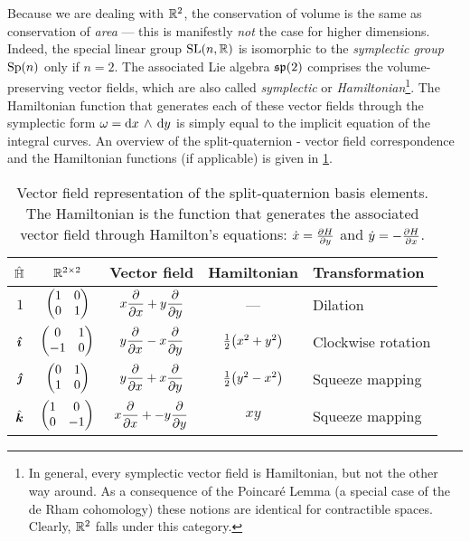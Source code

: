 Because we are dealing with $\real^2$, the conservation of volume is the same as conservation of \emph{area} --- this is manifestly \emph{not} the case for higher dimensions.  Indeed, the special linear group $\slgroup{n}{\real}$ is isomorphic to the \emph{symplectic group} $\spgroup{n}$ only if $n = 2$. The associated Lie algebra $\spalg{2}$ comprises the volume-preserving vector fields, which are also called \emph{symplectic} or \emph{Hamiltonian}\footnote{In general, every symplectic vector field is Hamiltonian, but not the other way around. As a consequence of the Poincaré Lemma (a special case of the de Rham cohomology) these notions are identical for contractible spaces. Clearly, $\real^2$ falls under this category.}. The Hamiltonian function that generates each of these vector fields through the symplectic form $\omega = \wedgep{\dd{x}}{\dd{y}}$ is simply equal to the implicit equation of the integral curves. An overview of the split-quaternion - vector field correspondence and the Hamiltonian functions (if applicable) is given in \cref{tab:basis_vf}.

\begin{table}[ht!]
    \centering
    \caption{Vector field representation of the split-quaternion basis elements. The Hamiltonian is the function that generates the associated vector field through Hamilton's equations: $\dot{x} = \pdv{H}{y}$ and $\dot{y} = -\pdv{H}{x}$.}
    \label{tab:basis_vf}
    \begin{tabular}{ccccl}
        \toprule
        $\spquaternions$ &  $ \real^{2\times 2} $ & \textbf{Vector field} & \textbf{Hamiltonian} & \textbf{Transformation} \\
        \midrule
        $1$ & $\mqty(1 & 0 \\ 0 & 1) $ & $\displaystyle x\pdv{}{x} + y\pdv{}{y} $ & --- & Dilation \\[0.4cm]
        $\quati$ & $\mqty(0 & 1 \\ -1 & 0) $ & $\displaystyle y\pdv{}{x} - x\pdv{}{y} $ & $ \tfrac{1}{2}\qty(x^2 + y^2) $ & Clockwise rotation \\[0.4cm]
        $\quatj$ & $\mqty(0 & 1 \\ 1 & 0) $ & $\displaystyle y\pdv{}{x} + x\pdv{}{y} $ & $ \tfrac{1}{2}\qty(y^2 - x^2) $ & Squeeze mapping \\[0.4cm]
        $\quatk$ & $\mqty(1 & 0 \\ 0 & -1) $ & $\displaystyle x\pdv{}{x} + -y\pdv{}{y} $ & $ xy $ & Squeeze mapping \\[0.4cm]
        \bottomrule
    \end{tabular}
\end{table}

